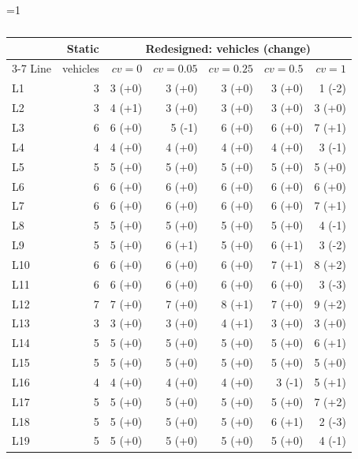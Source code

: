 \documentclass[a4paper,fleqn]{cas-sc}
\newcommand{\keepcomment}{1} %
\begin{document}
\begin{table}[p]
\centering
\caption{}
\label{tab:beijing_fleet}
\small
\setlength{\tabcolsep}{3.5pt}
\renewcommand{\arraystretch}{0.97}
\ifnum\keepcomment=1\color{red}\fi
\begin{tabular}{lrrrrrr}
\toprule
 & Static & \multicolumn{5}{c}{Redesigned: vehicles (change)} \\
\cmidrule(lr){3-7}
Line & vehicles & $cv=0$ & $cv=0.05$ & $cv=0.25$ & $cv=0.5$ & $cv=1$ \\
\midrule
L1 & 3 & 3 (+0) & 3 (+0) & 3 (+0) & 3 (+0) & 1 (-2) \\
L2 & 3 & 4 (+1) & 3 (+0) & 3 (+0) & 3 (+0) & 3 (+0) \\
L3 & 6 & 6 (+0) & 5 (-1) & 6 (+0) & 6 (+0) & 7 (+1) \\
L4 & 4 & 4 (+0) & 4 (+0) & 4 (+0) & 4 (+0) & 3 (-1) \\
L5 & 5 & 5 (+0) & 5 (+0) & 5 (+0) & 5 (+0) & 5 (+0) \\
L6 & 6 & 6 (+0) & 6 (+0) & 6 (+0) & 6 (+0) & 6 (+0) \\
L7 & 6 & 6 (+0) & 6 (+0) & 6 (+0) & 6 (+0) & 7 (+1) \\
L8 & 5 & 5 (+0) & 5 (+0) & 5 (+0) & 5 (+0) & 4 (-1) \\
L9 & 5 & 5 (+0) & 6 (+1) & 5 (+0) & 6 (+1) & 3 (-2) \\
L10 & 6 & 6 (+0) & 6 (+0) & 6 (+0) & 7 (+1) & 8 (+2) \\
L11 & 6 & 6 (+0) & 6 (+0) & 6 (+0) & 6 (+0) & 3 (-3) \\
L12 & 7 & 7 (+0) & 7 (+0) & 8 (+1) & 7 (+0) & 9 (+2) \\
L13 & 3 & 3 (+0) & 3 (+0) & 4 (+1) & 3 (+0) & 3 (+0) \\
L14 & 5 & 5 (+0) & 5 (+0) & 5 (+0) & 5 (+0) & 6 (+1) \\
L15 & 5 & 5 (+0) & 5 (+0) & 5 (+0) & 5 (+0) & 5 (+0) \\
L16 & 4 & 4 (+0) & 4 (+0) & 4 (+0) & 3 (-1) & 5 (+1) \\
L17 & 5 & 5 (+0) & 5 (+0) & 5 (+0) & 5 (+0) & 7 (+2) \\
L18 & 5 & 5 (+0) & 5 (+0) & 5 (+0) & 6 (+1) & 2 (-3) \\
L19 & 5 & 5 (+0) & 5 (+0) & 5 (+0) & 5 (+0) & 4 (-1) \\

\end{tabular}
\end{table}
\end{document}
